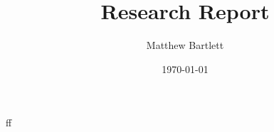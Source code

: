 \documentclass[12pt]{article}
\begin{document}
	\author{Matthew Bartlett}
	\title{Research Report}
	\date{\today}
	\maketitle


	\begin{paragraph}
		ff\cite{GameTheory}
	\end{paragraph}


	\printbibliography{}
\end{document}
